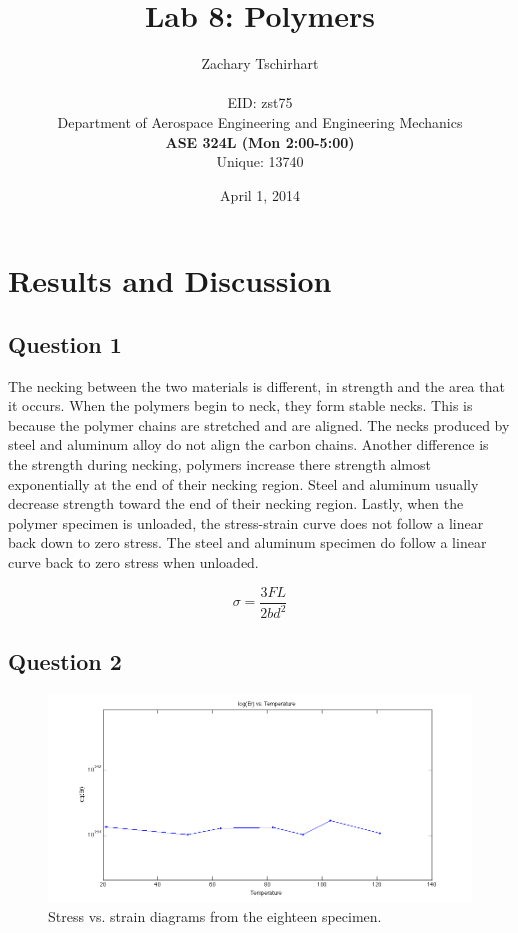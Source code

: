 \documentclass[12pt]{report}
\title{Lab 8: Polymers}
\author{Zachary Tschirhart \\
	\small \\
        \small EID: zst75 \\
	\small Department of Aerospace Engineering and Engineering Mechanics \\
	\small \textbf{ASE 324L (Mon 2:00-5:00)} \\
	\small Unique: 13740}
\date{April 1, 2014}
\begin{document}
\maketitle

\setcounter{secnumdepth}{0}

\section{Results and Discussion}
\doublespacing

\subsection{Question 1}

The necking between the two materials is different, in strength and the area that it occurs. When the polymers begin to neck, they form stable necks. This is because the polymer chains are stretched and are aligned. The necks produced by steel and aluminum alloy do not align the carbon chains. Another difference is the strength during necking, polymers increase there strength almost exponentially at the end of their necking region. Steel and aluminum usually decrease strength toward the end of their necking region. Lastly, when the polymer specimen is unloaded, the stress-strain curve does not follow a linear back down to zero stress. The steel and aluminum specimen do follow a linear curve back to zero stress when unloaded.

\begin{equation}
  \sigma = \frac{3FL}{2bd^2}
  \label{equation:equation1}
\end{equation}

\subsection{Question 2}

\begin{figure}[H]
	\includegraphics[width=1\textwidth]{problem2.png}
	\caption{Stress vs. strain diagrams from the eighteen specimen.}
	\label{fig:Figure1}
\end{figure}
\end{document}
